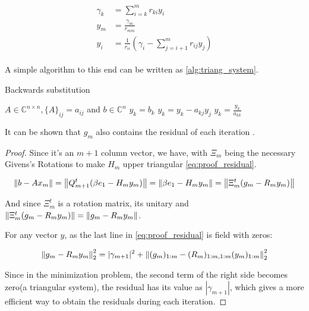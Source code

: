 \begin{align}\label{eq:triangular_system}
    \begin{split}
        \gamma_{k} &= \sum_{i=k}^{m} r_{ki} y_{i}\\
        y_{m} &= \frac{\gamma_{m}}{r_{mm}} \\
        y_{i} &= \frac{1}{r_{ii}} \left( \gamma_{i} - \sum_{j=i+1}^{m} r_{ij} y_{j}  \right)
    \end{split}
\end{align}

A simple algorithm to this end can be written as \ref{alg:triang_system}.

\begin{algorithm}
    \caption{Backwards substitution}\label{alg:triang_system}
    \begin{algorithmic}[1]
        \State $A \in \mathbb{C}^{n \times n}, \{ A \}_{ij} = a_{ij}$ and $b\in \mathbb{C}^{n}$
        \State $y_{k} = b_{k}$
        \State $y_{k} = y_{k} - a_{kj}y_{j}$
        \EndFor
        \State $y_{k} = \frac{y_{k}}{a_{kk}}$
        \EndFor
    \end{algorithmic}
\end{algorithm}



It can be shown that $g_{m}$ also contains the residual of each iteration \cite{saad2003iterative}.

\begin{proof}

    Since it's an $m+1$ column vector, we have, with $\Xi_{m}$ being the necessary Givens's Rotations to make $H_{m}$ upper triangular \ref{eq:proof_residual}.


    \begin{equation}\label{eq:proof_residual}
        \left\lVert b - Ax_{m}\right\rVert = \left\lVert Q_{m+1}^{t}(\beta e_{1} - H_{m}y_{m})\right\rVert = \left\lVert\beta e_{1} - H_{m}y_{m}\right\rVert = \left\lVert\Xi_{m}^{t} (g_{m} - R_{m}y_{m})\right\rVert
    \end{equation}

    And since $\Xi_{m}^{t}$ is a rotation matrix, its unitary and $\left\lVert\Xi_{m}^{t} (g_{m} - R_{m}y_{m})\right\rVert=\left\lVert g_{m} - R_{m}y_{m}\right\rVert$.

    For any vector $y$, as the last line in \ref{eq:proof_residual} is field with zeros:

    \begin{equation}
        \left\lVert g_{m} - R_{m}y_{m}\right\rVert_{2}^{2} = |\gamma_{m+1}|^{2} + \left\lVert(g_{m})_{1:m} - (R_{m})_{1:m,1:m} (y_{m})_{1:m}\right\rVert_{2}^{2}
    \end{equation}

    Since in the minimization problem, the second term of the right side becomes zero(a triangular system), the residual has its value as $|\gamma_{m+1}|$, which gives a more efficient way to obtain the residuals during each iteration.
\end{proof}

